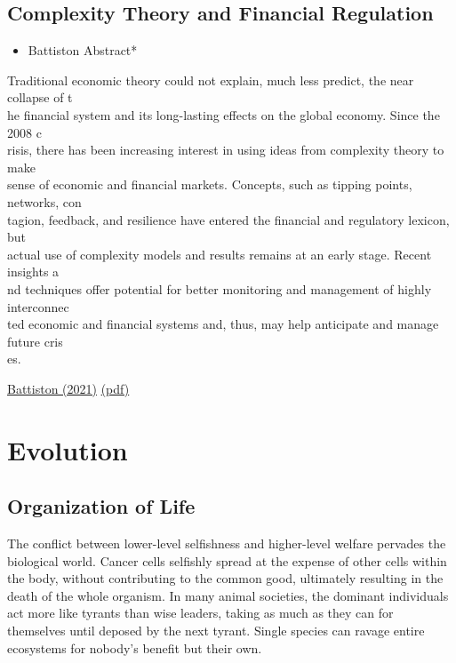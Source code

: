 \documentclass[
]{book}
\providecommand{\tightlist}{%
  \setlength{\itemsep}{0pt}\setlength{\parskip}{0pt}}
\begin{document}
\hypertarget{complexity-theory-and-financial-regulation}{%
\section{Complexity Theory and Financial Regulation}\label{complexity-theory-and-financial-regulation}}

\begin{itemize}
\tightlist
\item
  Battiston Abstract*
\end{itemize}

Traditional economic theory could not explain, much less predict, the near collapse of t\\
he financial system and its long-lasting effects on the global economy. Since the 2008 c\\
risis, there has been increasing interest in using ideas from complexity theory to make\\
sense of economic and financial markets. Concepts, such as tipping points, networks, con\\
tagion, feedback, and resilience have entered the financial and regulatory lexicon, but\\
actual use of complexity models and results remains at an early stage. Recent insights a\\
nd techniques offer potential for better monitoring and management of highly interconnec\\
ted economic and financial systems and, thus, may help anticipate and manage future cris\\
es.

\href{https://www.science.org/doi/10.1126/science.aad0299}{Battiston (2021)}
\href{pdf/Battiston_2021_Complexity_Theory_and_Financial_Regulation.pdf}{(pdf)}

\hypertarget{evolution}{%
\chapter{Evolution}\label{evolution}}

\hypertarget{organization-of-life}{%
\section{Organization of Life}\label{organization-of-life}}

The conflict between lower-level selfishness and higher-level welfare pervades the biological world. Cancer cells selfishly spread at the expense of other cells within the body, without contributing to the common good, ultimately resulting in the death of the whole organism. In many animal societies, the dominant individuals act more like tyrants than wise leaders, taking as much as they can for themselves until deposed by the next tyrant. Single species can ravage entire ecosystems for nobody's benefit but their own.
\end{document}
